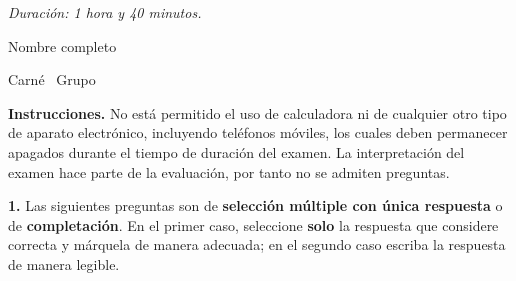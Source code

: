 \documentclass[11pt]{article}
\begin{document}
\examheader

\vspace{4pt}
\noindent\textit{Duración: 1 hora y 40 minutos.}

\vspace{6pt}
\noindent Nombre completo \dotfill

\noindent Carné \dotfill\ Grupo \dotfill

\vspace{8pt}
\noindent\textbf{Instrucciones.} No está permitido el uso de calculadora ni de cualquier otro tipo de aparato electrónico, incluyendo teléfonos móviles, los cuales deben permanecer apagados durante el tiempo de duración del examen. La interpretación del examen hace parte de la evaluación, por tanto no se admiten preguntas.

\vspace{10pt}
\noindent\textbf{1.} Las siguientes preguntas son de \textbf{selección múltiple con única respuesta} o de \textbf{completación}. En el primer caso, seleccione \textbf{solo} la respuesta que considere correcta y márquela de manera adecuada; en el segundo caso escriba la respuesta de manera legible.
\end{document}
